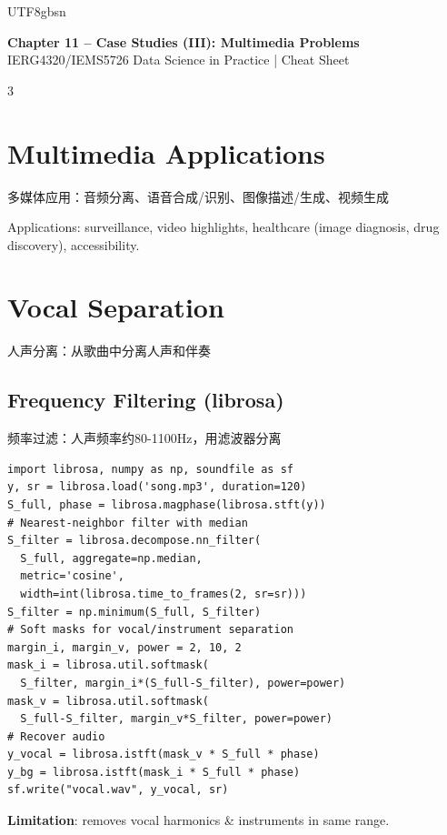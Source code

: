 \documentclass[9pt,landscape,a4paper]{article}
\newcommand{\zhint}[1]{{\scriptsize\color{gray!70!black}#1}}
\begin{document}
\begin{CJK}{UTF8}{gbsn}

\begin{center}
{\large\bfseries\color{blue!70!black} Chapter 11 -- Case Studies (III): Multimedia Problems}\\
{\footnotesize IERG4320/IEMS5726 Data Science in Practice | Cheat Sheet}
\end{center}

\begin{multicols}{3}

\section{Multimedia Applications}
\zhint{多媒体应用：音频分离、语音合成/识别、图像描述/生成、视频生成}

Applications: surveillance, video highlights, healthcare (image diagnosis, drug discovery), accessibility.

\section{Vocal Separation}
\zhint{人声分离：从歌曲中分离人声和伴奏}

\subsection{Frequency Filtering (librosa)}
\zhint{频率过滤：人声频率约80-1100Hz，用滤波器分离}
\begin{lstlisting}
import librosa, numpy as np, soundfile as sf
y, sr = librosa.load('song.mp3', duration=120)
S_full, phase = librosa.magphase(librosa.stft(y))
# Nearest-neighbor filter with median
S_filter = librosa.decompose.nn_filter(
  S_full, aggregate=np.median,
  metric='cosine',
  width=int(librosa.time_to_frames(2, sr=sr)))
S_filter = np.minimum(S_full, S_filter)
# Soft masks for vocal/instrument separation
margin_i, margin_v, power = 2, 10, 2
mask_i = librosa.util.softmask(
  S_filter, margin_i*(S_full-S_filter), power=power)
mask_v = librosa.util.softmask(
  S_full-S_filter, margin_v*S_filter, power=power)
# Recover audio
y_vocal = librosa.istft(mask_v * S_full * phase)
y_bg = librosa.istft(mask_i * S_full * phase)
sf.write("vocal.wav", y_vocal, sr)
\end{lstlisting}
\textbf{Limitation}: removes vocal harmonics \& instruments in same range.


\end{multicols}
\end{CJK}
\end{document}
